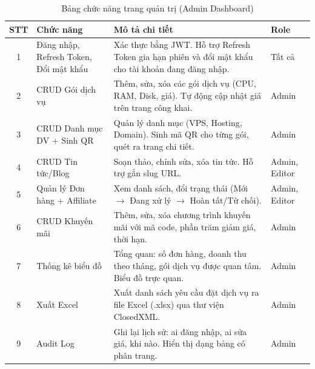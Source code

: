 \begin{table}[htbp]
    \centering
    \caption{Bảng chức năng trang quản trị (Admin Dashboard)}
    \label{tab:func_admin}
    \begin{tabular}{|c|p{3.5cm}|p{6cm}|p{2.5cm}|}
        \hline
        \textbf{STT} & \textbf{Chức năng} & \textbf{Mô tả chi tiết} & \textbf{Role} \\
        \hline
        1 & Đăng nhập, Refresh Token, Đổi mật khẩu & Xác thực bằng JWT. Hỗ trợ Refresh Token gia hạn phiên và đổi mật khẩu cho tài khoản đang đăng nhập. & Tất cả \\
        \hline
        2 & CRUD Gói dịch vụ & Thêm, sửa, xóa các gói dịch vụ (CPU, RAM, Disk, giá). Tự động cập nhật giá trên trang công khai. & Admin \\
        \hline
        3 & CRUD Danh mục DV + Sinh QR & Quản lý danh mục (VPS, Hosting, Domain). Sinh mã QR cho từng gói, quét ra trang chi tiết. & Admin \\
        \hline
        4 & CRUD Tin tức/Blog & Soạn thảo, chỉnh sửa, xóa tin tức. Hỗ trợ gắn slug URL. & Admin, Editor \\
        \hline
        5 & Quản lý Đơn hàng + Affiliate & Xem danh sách, đổi trạng thái (Mới $\rightarrow$ Đang xử lý $\rightarrow$ Hoàn tất/Từ chối). & Admin, Editor \\
        \hline
        6 & CRUD Khuyến mãi & Thêm, sửa, xóa chương trình khuyến mãi với mã code, phần trăm giảm giá, thời hạn. & Admin \\
        \hline
        7 & Thống kê biểu đồ & Tổng quan: số đơn hàng, doanh thu theo tháng, gói dịch vụ được quan tâm. Biểu đồ trực quan. & Admin \\
        \hline
        8 & Xuất Excel & Xuất danh sách yêu cầu đặt dịch vụ ra file Excel (.xlsx) qua thư viện ClosedXML. & Admin \\
        \hline
        9 & Audit Log & Ghi lại lịch sử: ai đăng nhập, ai sửa giá, khi nào. Hiển thị dạng bảng có phân trang. & Admin \\
        \hline
    \end{tabular}
\end{table}

